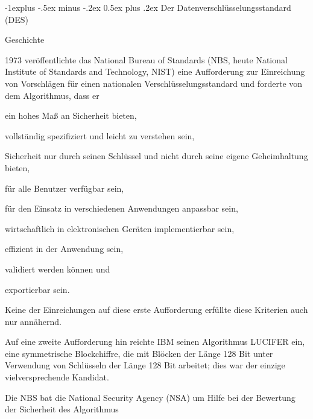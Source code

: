 \documentclass[a4paper]{article}
\makeatletter
\renewcommand{\subsection}{\@startsection{subsection}{2}{0mm}%
 {-1explus -.5ex minus -.2ex}%
 {0.5ex plus .2ex}%
 {\normalfont\normalsize\bfseries}}
\makeatother
\begin{document}
\begin{multicols}{3}
      \subsection{Der Datenverschlüsselungsstandard
            (DES)}

      Geschichte

      \begin{itemize*}
            \item 1973 veröffentlichte das National Bureau of Standards (NBS, heute
            National Institute of Standards and Technology, NIST) eine
            Aufforderung zur Einreichung von Vorschlägen für einen nationalen
            Verschlüsselungsstandard und forderte von dem Algorithmus, dass er
            \begin{itemize*}
                  \item ein hohes Maß an Sicherheit bieten,
                  \item vollständig spezifiziert und leicht zu verstehen sein,
                  \item Sicherheit nur durch seinen Schlüssel und nicht durch seine eigene Geheimhaltung bieten,
                  \item für alle Benutzer verfügbar sein,
                  \item für den Einsatz in verschiedenen Anwendungen anpassbar sein,
                  \item wirtschaftlich in elektronischen Geräten implementierbar sein,
                  \item effizient in der Anwendung sein,
                  \item validiert werden können und
                  \item exportierbar sein.
            \end{itemize*}
            \item Keine der Einreichungen auf diese erste Aufforderung erfüllte diese
            Kriterien auch nur annähernd.
            \item Auf eine zweite Aufforderung hin reichte IBM seinen Algorithmus
            LUCIFER ein, eine symmetrische Blockchiffre, die mit Blöcken der Länge
            128 Bit unter Verwendung von Schlüsseln der Länge 128 Bit arbeitet;
            dies war der einzige vielversprechende Kandidat.
            \item Die NBS bat die National Security Agency (NSA) um Hilfe bei der
            Bewertung der Sicherheit des Algorithmus
            \begin{itemize*}

\end{itemize*}
\end{itemize*}
\end{multicols}
\end{document}
